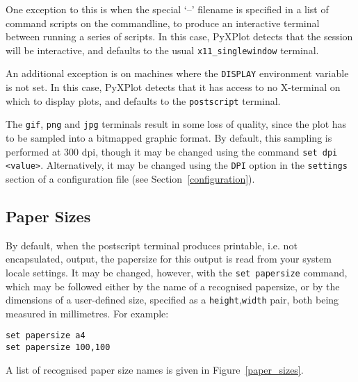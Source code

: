 \documentclass[a4paper,onecolumn,11pt]{book}
\begin{document}
One exception to this is when the special `--' filename is specified in a list
of command scripts on the commandline, to produce an interactive terminal
between running a series of scripts. In this case, PyXPlot detects that the
session will be interactive, and defaults to the usual
\texttt{x11\_singlewindow} terminal.

An additional exception is on machines where the \texttt{DISPLAY} environment
variable is not set. In this case, PyXPlot detects that it has access to no
X-terminal on which to display plots, and defaults to the \texttt{postscript}
terminal.

The \texttt{gif}, \texttt{png} and \texttt{jpg} terminals result in some loss
of quality, since the plot has to be sampled into a bitmapped graphic format.
By default, this sampling is performed at 300 dpi, though it may be changed
using the command \texttt{set dpi <value>}. Alternatively, it may be changed
using the \texttt{DPI} option in the \texttt{settings} section of a
configuration file (see Section~\ref{configuration}).

\subsection{Paper Sizes}

By default, when the postscript terminal produces printable, i.e. not
encapsulated, output, the papersize for this output is read from your system
locale settings. It may be changed, however, with the \texttt{set
papersize} command,
which may be followed either by the name of a recognised papersize, or by the
dimensions of a user-defined size, specified as a
\texttt{height},\texttt{width} pair, both being measured in millimetres. For
example:

\begin{verbatim}
set papersize a4
set papersize 100,100
\end{verbatim}

A list of recognised paper size names is given in Figure~\ref{paper_sizes}.
\end{document}
